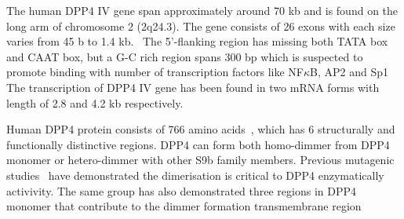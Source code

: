 The human DPP4 IV gene span approximately around 70 kb and is found on the long arm of chromosome 2 (2q24.3). The gene consists of 26 exons with each size varies from 45 b to 1.4 kb.~\cite{Abbott1994} The 5'-flanking region has missing both TATA box and CAAT box, but a G-C rich region spans 300 bp which is suspected to promote binding with number of transcription factors like NF$\kappa$B, AP2 and Sp1~\cite{Abbott1994,Böhm1995} The transcription of DPP4 IV gene has been found in two mRNA forms with length of 2.8 and 4.2 kb respectively. 
\par
Human DPP4 protein consists of 766 amino acids~\cite{Bär2003,Misumi1992}, which has 6 structurally and functionally distinctive regions. DPP4 can form both homo-dimmer from DPP4 monomer or hetero-dimmer with other S9b family members. Previous mutagenic studies~\cite{Chien_2004,Chien_2006} have demonstrated the dimerisation is critical to DPP4 enzymatically activivity. The same group has also demonstrated three regions in DPP4 monomer that contribute to the dimmer formation transmembrane region